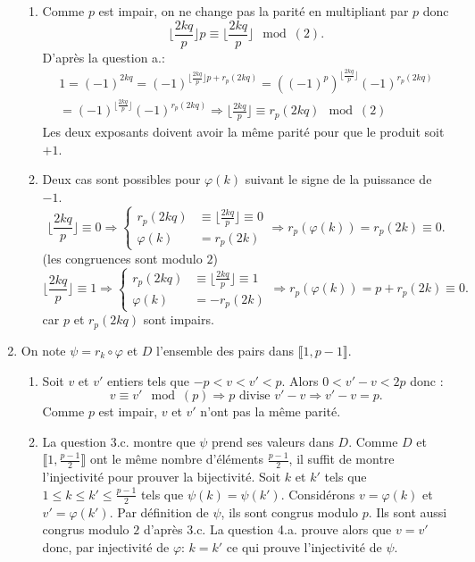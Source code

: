 \begin{enumerate}
\begin{enumerate}
    \item Comme $p$ est impair, on ne change pas la parité en multipliant par $p$ donc 
\[
  \lfloor\frac{2kq}{p}\rfloor p \equiv \lfloor\frac{2kq}{p}\rfloor \mod (2).
\]
D'après la question a.:
\begin{multline*}
  1 = (-1)^{2kq} = (-1)^{\lfloor \frac{2kq}{p}\rfloor p + r_p(2kq)}
  = \left((-1)^p\right)^{\lfloor \frac{2kq}{p}\rfloor }(-1)^{r_p(2kq)}\\
  = (-1)^{\lfloor \frac{2kq}{p}\rfloor}(-1)^{r_p(2kq)}
  \Rightarrow \lfloor \frac{2kq}{p}\rfloor \equiv r_p(2kq) \mod (2)
\end{multline*}
Les deux exposants doivent avoir la même parité pour que le produit soit $+1$.
    \item Deux cas sont possibles pour $\varphi(k)$ suivant le signe de la puissance de $-1$.
\[
  \lfloor \frac{2kq}{p}\rfloor \equiv 0  \Rightarrow 
  \left\lbrace
  \begin{aligned}
     r_p(2kq) &\equiv \lfloor\frac{2kq}{p}\rfloor \equiv 0  \\
     \varphi(k) &= r_p(2k)
  \end{aligned}
  \right.
\Rightarrow r_p(\varphi(k)) = r_p(2k) \equiv 0 .
\]
(les congruences sont modulo $2$)
\[
  \lfloor \frac{2kq}{p}\rfloor \equiv 1  \Rightarrow 
  \left\lbrace
  \begin{aligned}
     r_p(2kq) &\equiv \lfloor\frac{2kq}{p}\rfloor \equiv 1  \\
     \varphi(k) &= - r_p(2k)
  \end{aligned}
  \right.
\Rightarrow r_p(\varphi(k)) = p + r_p(2k) \equiv 0 .  
\]
car $p$ et $r_p(2kq)$ sont impairs.
  \end{enumerate}

  \item On note $\psi = r_k \circ \varphi$ et $D$ l'ensemble des pairs dans $\llbracket 1, p-1 \rrbracket$.
  \begin{enumerate}
    \item Soit $v$ et $v'$ entiers tels que $-p < v < v' < p$. Alors $0 < v' -v < 2p$ donc :
\[
  v \equiv v' \mod (p) \Rightarrow p \text{ divise } v' - v \Rightarrow v' - v = p.
\]
Comme $p$ est impair, $v$ et $v'$ n'ont pas la même parité.

    \item La question 3.c. montre que $\psi$ prend ses valeurs dans $D$. Comme $D$ et $\llbracket 1, \frac{p-1}{2}\rrbracket$ ont le même nombre d'éléments $\frac{p-1}{2}$, il suffit de montre l'injectivité pour prouver la bijectivité.\newline
    Soit $k$ et $k'$ tels que $1 \leq k \leq k' \leq \frac{p-1}{2}$ tels que $\psi(k) = \psi(k')$.\newline
    Considérons $v=\varphi(k)$ et $v' = \varphi(k')$. Par définition de $\psi$, ils sont congrus modulo $p$. Ils sont aussi congrus modulo $2$ d'après 3.c. La question 4.a. prouve alors que $v = v'$ donc, par injectivité de $\varphi$: $k = k'$ ce qui prouve l'injectivité de $\psi$.  
  \end{enumerate}

\end{enumerate}

